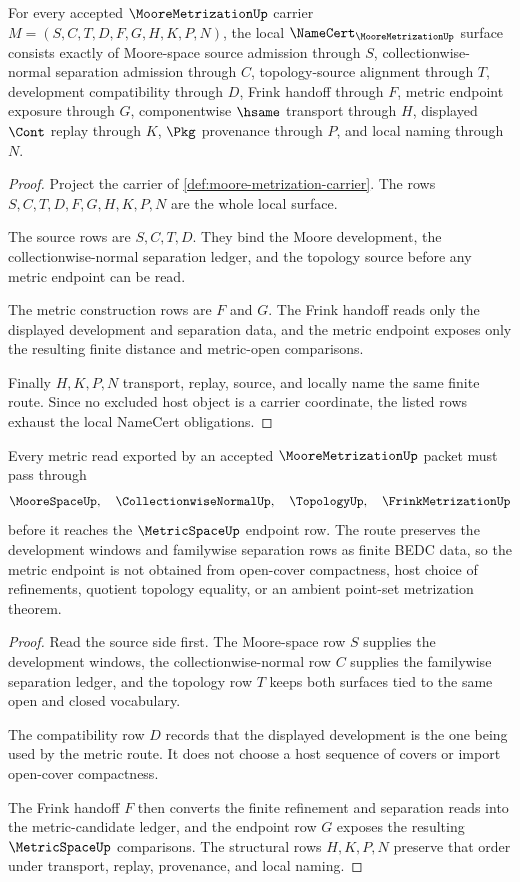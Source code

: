\begin{theorem}
\label{thm:moore-metrization-namecert-obligations}
For every accepted $\MooreMetrizationUp$ carrier $M=(S,C,T,D,F,G,H,K,P,N)$, the local $\NameCert_{\MooreMetrizationUp}$ surface consists exactly of Moore-space source admission through $S$, collectionwise-normal separation admission through $C$, topology-source alignment through $T$, development compatibility through $D$, Frink handoff through $F$, metric endpoint exposure through $G$, componentwise $\hsame$ transport through $H$, displayed $\Cont$ replay through $K$, $\Pkg$ provenance through $P$, and local naming through $N$.
\end{theorem}
\begin{proof}
Project the carrier of \autoref{def:moore-metrization-carrier}. The rows $S,C,T,D,F,G,H,K,P,N$ are the whole local surface.

The source rows are $S,C,T,D$. They bind the Moore development, the collectionwise-normal separation ledger, and the topology source before any metric endpoint can be read.

The metric construction rows are $F$ and $G$. The Frink handoff reads only the displayed development and separation data, and the metric endpoint exposes only the resulting finite distance and metric-open comparisons.

Finally $H,K,P,N$ transport, replay, source, and locally name the same finite route. Since no excluded host object is a carrier coordinate, the listed rows exhaust the local NameCert obligations.
\end{proof}

\begin{theorem}
\label{thm:moore-metrization-development-metric-route}
Every metric read exported by an accepted $\MooreMetrizationUp$ packet must pass through
$$
\MooreSpaceUp,\quad \CollectionwiseNormalUp,\quad \TopologyUp,\quad \FrinkMetrizationUp
$$
before it reaches the $\MetricSpaceUp$ endpoint row. The route preserves the development windows and familywise separation rows as finite BEDC data, so the metric endpoint is not obtained from open-cover compactness, host choice of refinements, quotient topology equality, or an ambient point-set metrization theorem.
\end{theorem}
\begin{proof}
Read the source side first. The Moore-space row $S$ supplies the development windows, the collectionwise-normal row $C$ supplies the familywise separation ledger, and the topology row $T$ keeps both surfaces tied to the same open and closed vocabulary.

The compatibility row $D$ records that the displayed development is the one being used by the metric route. It does not choose a host sequence of covers or import open-cover compactness.

The Frink handoff $F$ then converts the finite refinement and separation reads into the metric-candidate ledger, and the endpoint row $G$ exposes the resulting $\MetricSpaceUp$ comparisons. The structural rows $H,K,P,N$ preserve that order under transport, replay, provenance, and local naming.
\end{proof}

